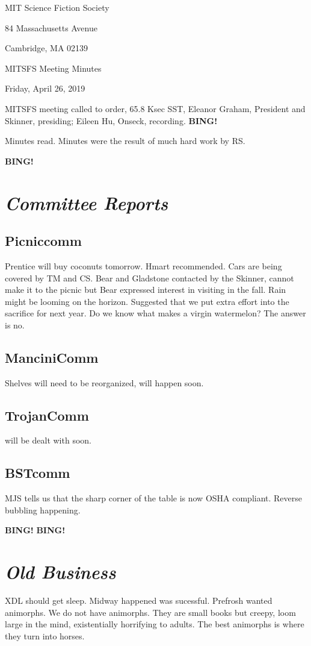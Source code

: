\documentclass[10pt]{article}
\newcommand{\bing}{{\bf BING!} }
\newcommand{\goto}[1]{\bing \vskip 12pt \section*{{\em{#1}}}}
\newcommand{\skinner}{Eleanor Graham, President and Skinner}
\newcommand{\onseck}{Eileen Hu, Onseck}
\newcommand{\meetingdate}{Friday, April 26, 2019 }
\begin{document}
\begin{center}

MIT Science Fiction Society

84 Massachusetts Avenue

Cambridge, MA 02139

\vspace{12pt}

MITSFS Meeting Minutes

\meetingdate

\end{center}

\vspace{18pt}

\setlength{\parskip}{6pt}

\noindent
MITSFS meeting called to order, 65.8 Ksec SST,
\skinner, presiding; \onseck, recording.
\bing

Minutes read. Minutes were the result of much hard work by RS.

\goto{Committee Reports}

\subsection*{Picniccomm}
Prentice will buy coconuts tomorrow. Hmart recommended.
Cars are being covered by TM and CS.
Bear and Gladstone contacted by the Skinner, cannot make it to the picnic but Bear expressed interest in visiting in the fall.
Rain might be looming on the horizon.
Suggested that we put extra effort into the sacrifice for next year. Do we know what makes a virgin watermelon? The answer is no.

\subsection*{ManciniComm}
Shelves will need to be reorganized, will happen soon.

\subsection*{TrojanComm}
will be dealt with soon.

\subsection*{BSTcomm}
MJS tells us that the sharp corner of the table is now OSHA compliant. Reverse bubbling happening.

\bing
\goto{Old Business}
XDL should get sleep.
Midway happened was sucessful. Prefrosh wanted animorphs. We do not have animorphs. They are small books but creepy, loom large in the mind, existentially horrifying to adults. The best animorphs is where they turn into horses.
\end{document}
